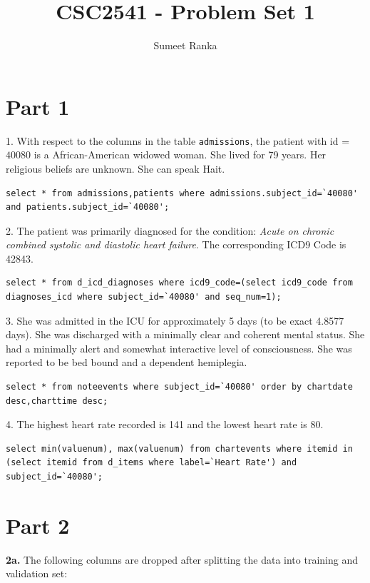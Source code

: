 \documentclass[]{article}
\title{CSC2541 - Problem Set 1}
\author{Sumeet Ranka}
\begin{document}
\maketitle

\section*{Part 1}
1. With respect to the columns in the table \texttt{admissions}, the patient with id = $40080$ is a African-American widowed woman. She lived for 79 years. Her religious beliefs are unknown. She can speak Hait. 

\begin{lstlisting}[]
select * from admissions,patients where admissions.subject_id=`40080' and patients.subject_id=`40080';
\end{lstlisting}

2. The patient was primarily diagnosed for the condition: \textit{Acute on chronic combined systolic and diastolic heart failure}. The corresponding ICD9 Code is 42843.

\begin{lstlisting}[]
select * from d_icd_diagnoses where icd9_code=(select icd9_code from diagnoses_icd where subject_id=`40080' and seq_num=1);
\end{lstlisting}

3. She was admitted in the ICU for approximately 5 days (to be exact 4.8577 days). She was discharged with a minimally clear and coherent mental status. She had a minimally alert and somewhat interactive level of consciousness. She was reported to be bed bound and a dependent hemiplegia.

\begin{lstlisting}[]
select * from noteevents where subject_id=`40080' order by chartdate desc,charttime desc;
\end{lstlisting}
 
4. The highest heart rate recorded is 141 and the lowest heart rate is 80. 

\begin{lstlisting}[]
select min(valuenum), max(valuenum) from chartevents where itemid in (select itemid from d_items where label=`Heart Rate') and subject_id=`40080';
\end{lstlisting}

\section*{Part 2}
\textbf{2a.} The following columns are dropped after splitting the data into training and validation set:
\end{document}
